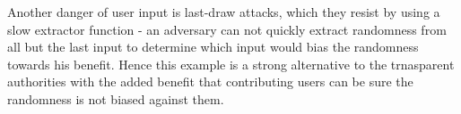 Another danger of user input is last-draw attacks, which they resist by using a slow extractor function - an adversary can not quickly extract randomness from all but the last input to determine which input would bias the randomness towards his benefit. Hence this example is a strong alternative to the trnasparent authorities with the added benefit that contributing users can be sure the randomness is not biased against them. 
